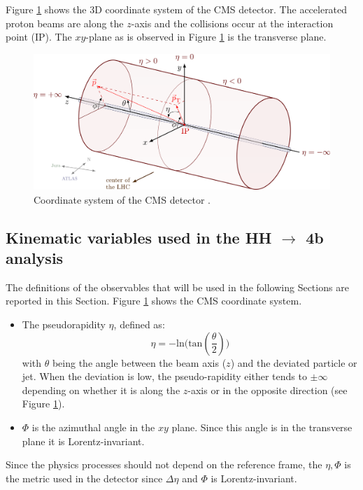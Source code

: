 Figure \ref{fig: coord syst} shows the 3D coordinate system of the CMS detector. The accelerated proton beams are along the $z$-axis and the collisions occur at the interaction point (IP). The $xy$-plane as is observed in Figure \ref{fig: coord syst} is the transverse plane.

\begin{figure}[hbt]
    \centering
    \includegraphics[width=0.7\linewidth]{Images/4.HH4b Analysis/axis3D_CMS-005.png}
    \caption{Coordinate system of the CMS detector \cite{CMScoord}.}
    \label{fig: coord syst}
\end{figure}

\subsection{Kinematic variables used in the HH $\to$ 4b analysis} \label{subsection: kinematic vars}
The definitions of the observables that will be used in the following Sections are reported in this Section. Figure \ref{fig: coord syst} shows the CMS coordinate system.

\begin{itemize}
    \item The pseudorapidity $\eta$, defined as:
    \begin{equation}
        \eta=-\mathrm{ln}\bigg(\text{tan}(\frac{\theta}{2})\bigg)
    \end{equation}
    with $\theta$ being the angle between the beam axis ($z$) and the deviated particle or jet. When the deviation is low, the pseudo-rapidity either tends to $\pm \infty$ depending on whether it is along the $z$-axis or in the opposite direction (see Figure \ref{fig: coord syst}).
    \item $\Phi$ is the azimuthal angle in the $xy$ plane. Since this angle is in the transverse plane it is Lorentz-invariant.
\end{itemize}

Since the physics processes should not depend on the reference frame, the $\eta, \Phi$ is the metric used in the detector since $\Delta \eta$ and $\Phi$ is Lorentz-invariant. 

